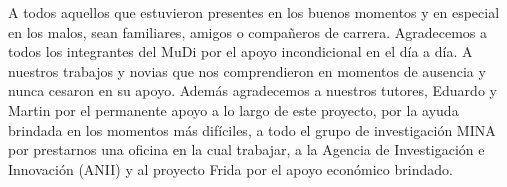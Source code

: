 
\begin{acknowledgements}      
A todos aquellos que estuvieron presentes en los buenos momentos y en especial en los malos, sean familiares, amigos o compa\~neros de carrera. Agradecemos a todos los integrantes del MuDi por el apoyo incondicional en el día a día. A nuestros trabajos y novias que nos comprendieron en momentos de ausencia y nunca cesaron en su apoyo. Adem\'as agradecemos a nuestros tutores, Eduardo y Martin por el permanente apoyo a lo largo de este proyecto, por la ayuda brindada en los momentos m\'as difíciles, a todo el grupo de investigaci\'on MINA por prestarnos una oficina en la cual trabajar, a la Agencia de Investigaci\'on e Innovaci\'on (ANII) y al proyecto Frida por el apoyo económico brindado.


\end{acknowledgements}
